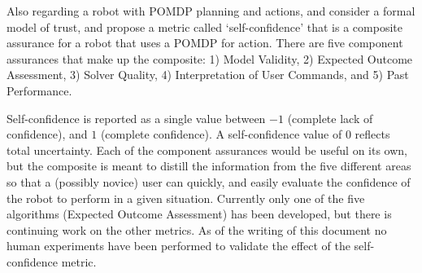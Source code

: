 Also regarding a robot with POMDP planning and actions, \citet{Aitken2016-fb} and \citet{Aitken2016-cv} consider a formal model of trust, and propose a metric called `self-confidence' that is a composite assurance for a robot that uses a POMDP for action. There are five component assurances that make up the composite: 1) Model Validity, 2) Expected Outcome Assessment, 3) Solver Quality, 4) Interpretation of User Commands, and 5) Past Performance. 

Self-confidence is reported as a single value between $-1$ (complete lack of confidence), and $1$ (complete confidence). A self-confidence value of $0$ reflects total uncertainty. Each of the component assurances would be useful on its own, but the composite is meant to distill the information from the five different areas so that a (possibly novice) user can quickly, and easily evaluate the confidence of the robot to perform in a given situation. Currently only one of the five algorithms (Expected Outcome Assessment) has been developed, but there is continuing work on the other metrics. As of the writing of this document no human experiments have been performed to validate the effect of the self-confidence metric.

